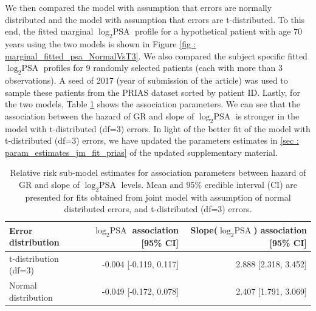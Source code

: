 \begin{enumerate}
	We then compared the model with assumption that errors are normally distributed and the model with assumption that errors are t-distributed. To this end, the fitted marginal $\log_2 \mbox{PSA}$ profile for a hypothetical patient with age 70 years using the two models is shown in Figure \ref{fig : marginal_fitted_psa_NormalVsT3}. We also compared the subject specific fitted $\log_2 \mbox{PSA}$ profiles for 9 randomly selected patients (each with more than 3 observations). A seed of 2017 (year of submission of the article) was used to sample these patients from the PRIAS dataset sorted by patient ID. Lastly, for the two models, Table \ref{tab : relative_risk_comparison} shows the association parameters. We can see that the association between the hazard of GR and slope of $\log_2 \mbox{PSA}$ is stronger in the model with t-distributed (df=3) errors. In light of the better fit of the model with t-distributed (df=3) errors, we have updated the parameters estimates in \ref{sec : param_estimates_jm_fit_prias} of the updated supplementary material.

	\begin{table}[!htb]
	\begin{center}
	\caption{Relative risk sub-model estimates for association parameters between hazard of GR and slope of $\log_2 \mbox{PSA}$ levels. Mean and 95\% credible interval (CI) are presented for fits obtained from joint model with assumption of normal distributed errors, and t-distributed (df=3) errors.}
	\label{tab : relative_risk_comparison}
	\begin{tabular}{lrr}
	\Hline
	Error distribution                      & $\log_2 \mbox{PSA}$ association [95\% CI]   & Slope($\log_2 \mbox{PSA}$) association [95\% CI]\\ 
	\hline
	t-distribution (df=3)                  & -0.004 [-0.119, 0.117] & 2.888 [2.318, 3.452] \\
	Normal distribution                    & -0.049 [-0.172, 0.078] & 2.407 [1.791, 3.069] \\
	\hline
	\end{tabular}	
	\end{center}
	\end{table}


\end{enumerate}
